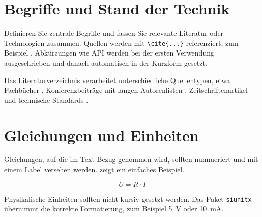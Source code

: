 
\section{Begriffe und Stand der Technik}

Definieren Sie zentrale Begriffe und fassen Sie relevante Literatur oder
Technologien zusammen. Quellen werden mit \verb|\cite{...}| referenziert, zum
Beispiel \cite{example-source}. Abkürzungen wie \ac{API} werden bei der ersten
Verwendung ausgeschrieben und danach automatisch in der Kurzform gesetzt.

Das Literaturverzeichnis verarbeitet unterschiedliche Quellentypen, etwa
Fachbücher \cite{latex-companion}, Konferenzbeiträge mit langen Autorenlisten
\cite{vaswani2017attention}, Zeitschriftenartikel \cite{hochreiter1997lstm}
und technische Standards \cite{rfc9110}.

\section{Gleichungen und Einheiten}

Gleichungen, auf die im Text Bezug genommen wird, sollten nummeriert und mit
einem Label versehen werden.  zeigt ein einfaches Beispiel.

\begin{equation}
  U = R \cdot I
  \label{eq:ohms-law}
\end{equation}

Physikalische Einheiten sollten nicht kursiv gesetzt werden. Das Paket
\verb|siunitx| übernimmt die korrekte Formatierung, zum Beispiel
\qty{5}{\volt} oder \qty{10}{\milli\ampere}.
